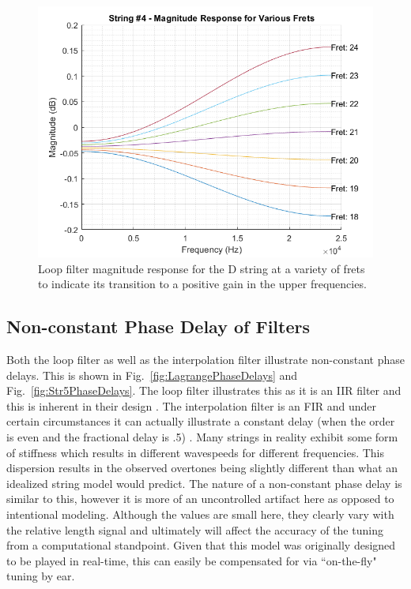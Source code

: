 \documentclass[../main.tex]{subfiles}
\begin{document}
\begin{figure}[h]
    \centering
    \includegraphics[scale=.47]{./images/plots/Unstable Loop Filter - String 4.png}
    \caption{Loop filter magnitude response for the D string at a variety of frets to indicate its transition to a positive gain in the upper frequencies.}
    \label{fig:UnstableLoopString4}
\end{figure}

\clearpage

\subsection{Non-constant Phase Delay of Filters}
Both the loop filter as well as the interpolation filter illustrate non-constant phase delays. This is shown in Fig.~\ref{fig:LagrangePhaseDelays} and Fig.~\ref{fig:Str5PhaseDelays}. The loop filter illustrates this as it is an IIR filter and this is inherent in their design . The interpolation filter is an FIR and under certain circumstances it can actually illustrate a constant delay (when the order is even and the fractional delay is .5) . Many strings in reality exhibit some form of stiffness which results in different wavespeeds for different frequencies. This dispersion results in the observed overtones being slightly different than what an idealized string model would predict. The nature of a non-constant phase delay is similar to this, however it is more of an uncontrolled artifact here as opposed to intentional modeling. Although the values are small here, they clearly vary with the relative length signal and ultimately will affect the accuracy of the tuning from a computational standpoint. Given that this model was originally designed to be played in real-time, this can easily be compensated for via ``on-the-fly" tuning by ear.
\end{document}
